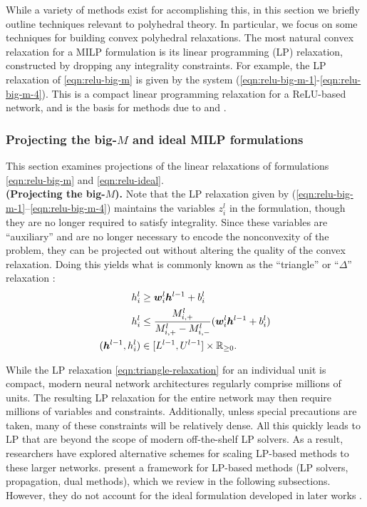 While a variety of methods exist for accomplishing this, in this section we briefly outline techniques relevant to polyhedral theory. 
In particular, we focus on some techniques for building convex polyhedral relaxations. 
The most natural convex relaxation for a MILP formulation is its linear programming (LP) relaxation, constructed by dropping any integrality constraints. For example, the LP relaxation of \eqref{eqn:relu-big-m} is given by the system (\ref{eqn:relu-big-m-1}-\ref{eqn:relu-big-m-4}). This is a compact linear programming relaxation for a ReLU-based network, and is the basis for methods due to \cite{bunel2020lagrangian} and \cite{ehlers2017formal}.

\subsubsection{Projecting the big-$M$ and ideal MILP formulations}
This section examines projections of the linear relaxations of formulations \eqref{eqn:relu-big-m} and \eqref{eqn:relu-ideal}. \\

\textbf{(Projecting the big-$M$).}
Note that the LP relaxation given by (\ref{eqn:relu-big-m-1}--\ref{eqn:relu-big-m-4}) maintains the variables $z^l_i$ in the formulation, though they are no longer required to satisfy integrality. Since these variables are ``auxiliary'' and are no longer necessary to encode the nonconvexity of the problem, they can be projected out without altering the quality of the convex relaxation. Doing this yields what is commonly known as the ``triangle'' or ``$\Delta$'' relaxation \citep{salman2019convex}:
\begin{subequations} \label{eqn:triangle-relaxation}
\begin{align}
    h^l_i &\geq {\bm{w}}^l_i {\bm{h}}^{l-1} + b^l_i \\
    h^l_i &\leq \frac{M^l_{i,+}}{M^l_{i,+} - M^l_{i,-}}({\bm{w}}^l_i {\bm{h}}^{l-1} + b^l_i) \\
    ({\bm{h}}^{l-1},h^l_i) &\in [L^{l-1},U^{l-1}] \times \mathbb{R}_{\geq 0}.
\end{align}
\end{subequations}

While the LP relaxation \eqref{eqn:triangle-relaxation} for an individual unit is compact, modern neural network architectures regularly comprise millions of units. The resulting LP relaxation for the entire network may then require millions of variables and constraints. Additionally, unless special precautions are taken, many of these constraints will be relatively dense. All this quickly leads to LP that are beyond the scope of modern off-the-shelf LP solvers. As a result, researchers have explored alternative schemes for scaling LP-based methods to these larger networks.
\cite{salman2019convex} present a framework for LP-based methods (LP solvers, propagation, dual methods), which we review in the following subsections. However, they do not account for the ideal formulation developed in later works \citep{anderson2020strong,depalma2021scaling}. 


